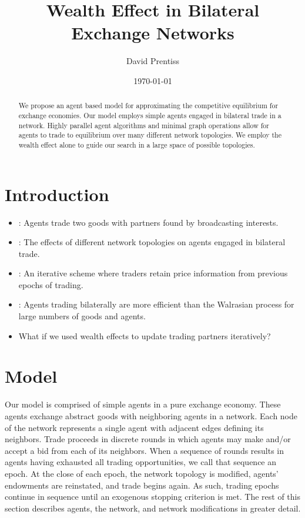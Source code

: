 \documentclass[smallextended]{svjour3}
\begin{document}
\title{Wealth Effect in Bilateral Exchange Networks}
\author{David Prentiss}
\date{\today}
\maketitle
\begin{abstract}
  We propose an agent based model for approximating the competitive
  equilibrium for exchange economies. Our model employs simple agents
  engaged in bilateral trade in a network. Highly parallel agent algorithms and
  minimal graph operations allow for agents to trade to equilibrium over many
  different network topologies. We employ the wealth effect alone to guide our
  search in a large space of possible topologies.
\end{abstract}
\section{Introduction}
  \begin{itemize}
  \item \cite{albin1992decentralized}: Agents trade two goods with partners found by
    broadcasting interests.
  \item \cite{wilhite2001bilateral}: The effects of different network
  topologies on agents engaged in bilateral trade.
  \item \cite{sunder2002simple}: An iterative scheme where traders retain
  price information from previous epochs of trading.
  \item \cite{axtell2005complexity}: Agents trading bilaterally are more
    efficient than the Walrasian process for large numbers of goods and agents.
  \item What if we used wealth effects to update trading partners iteratively?
  \end{itemize}
\section{Model}
Our model is comprised of simple agents in a pure exchange economy.
These agents exchange abstract goods with neighboring agents in a network.
Each node of the network represents a single agent with adjacent edges defining
its neighbors.
Trade proceeds in discrete rounds in which agents may make and/or accept a bid
from each of its neighbors.
When a sequence of rounds results in agents having exhausted all trading
opportunities, we call that sequence an epoch.
At the close of each epoch, the network topology is modified, agents'
endowments are reinstated, and trade begins again.
As such, trading epochs continue in sequence until an exogenous stopping
criterion is met.
The rest of this section describes agents, the network, and network
modifications in greater detail.
\end{document}
